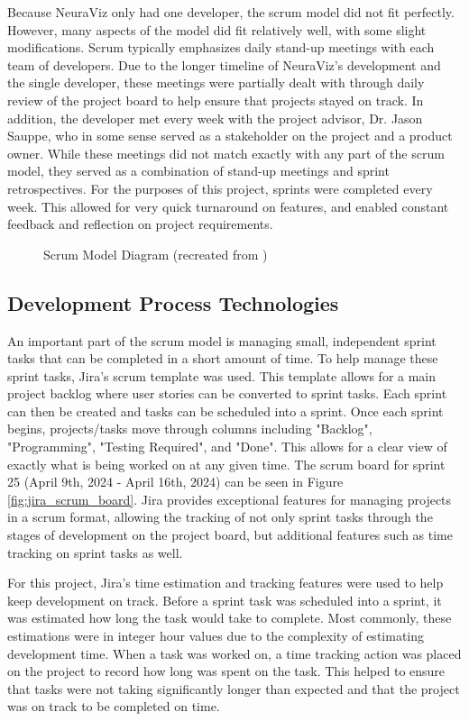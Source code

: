 Because NeuraViz only had one developer, the scrum model did not fit perfectly. However, many aspects of the model did fit relatively well, with some slight modifications. Scrum typically emphasizes daily stand-up meetings with each team of developers. Due to the longer timeline of NeuraViz's development and the single developer, these meetings were partially dealt with through daily review of the project board to help ensure that projects stayed on track. In addition, the developer met every week with the project advisor, Dr. Jason Sauppe, who in some sense served as a stakeholder on the project and a product owner. While these meetings did not match exactly with any part of the scrum model, they served as a combination of stand-up meetings and sprint retrospectives. For the purposes of this project, sprints were completed every week. This allowed for very quick turnaround on features, and enabled constant feedback and reflection on project requirements.

\begin{figure}[htb]
    \centering
    
    \caption[Scrum Model Diagram]{Scrum Model Diagram (recreated from \cite{tutorialspointAgile})}
    \label{fig:scrum_model}
\end{figure}

\subsection{Development Process Technologies}
An important part of the scrum model is managing small, independent sprint tasks that can be completed in a short amount of time. To help manage these sprint tasks, Jira's \cite{jira} scrum template was used. This template allows for a main project backlog where user stories can be converted to sprint tasks. Each sprint can then be created and tasks can be scheduled into a sprint. Once each sprint begins, projects/tasks move through columns including "Backlog", "Programming", "Testing Required", and "Done". This allows for a clear view of exactly what is being worked on at any given time. The scrum board for sprint 25 (April 9th, 2024 - April 16th, 2024) can be seen in Figure \ref{fig:jira_scrum_board}. Jira provides exceptional features for managing projects in a scrum format, allowing the tracking of not only sprint tasks through the stages of development on the project board, but additional features such as time tracking on sprint tasks as well.

For this project, Jira's time estimation and tracking features were used to help keep development on track. Before a sprint task was scheduled into a sprint, it was estimated how long the task would take to complete. Most commonly, these estimations were in integer hour values due to the complexity of estimating development time. When a task was worked on, a time tracking action was placed on the project to record how long was spent on the task. This helped to ensure that tasks were not taking significantly longer than expected and that the project was on track to be completed on time.

